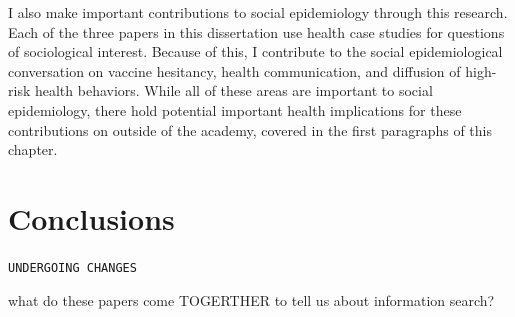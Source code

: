 I also make important contributions to social epidemiology through this
research. Each of the three papers in this dissertation use health case
studies for questions of sociological interest. Because of this, I 
contribute to the social epidemiological conversation on vaccine hesitancy,
health communication, and diffusion of high-risk health behaviors. While
all of these areas are important to social epidemiology, there hold
potential important health implications for these contributions on
outside of the academy, covered in the first paragraphs of this chapter.



\section{Conclusions}
\begin{center}
    \texttt{UNDERGOING CHANGES}
\end{center}


what do these papers come TOGERTHER to tell us about information search?

